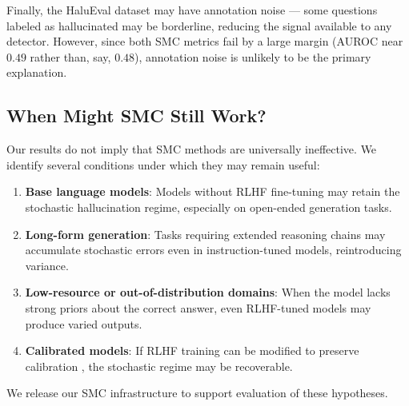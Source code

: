 Finally, the HaluEval dataset may have annotation noise --- some questions labeled as hallucinated may be borderline, reducing the signal available to any detector. However, since both SMC metrics fail by a large margin (AUROC near $0.49$ rather than, say, $0.48$), annotation noise is unlikely to be the primary explanation.

\subsection{When Might SMC Still Work?}

Our results do not imply that SMC methods are universally ineffective. We identify several conditions under which they may remain useful:

\begin{enumerate}
  \item \textbf{Base language models}: Models without RLHF fine-tuning may retain the stochastic hallucination regime, especially on open-ended generation tasks.
  \item \textbf{Long-form generation}: Tasks requiring extended reasoning chains may accumulate stochastic errors even in instruction-tuned models, reintroducing variance.
  \item \textbf{Low-resource or out-of-distribution domains}: When the model lacks strong priors about the correct answer, even RLHF-tuned models may produce varied outputs.
  \item \textbf{Calibrated models}: If RLHF training can be modified to preserve calibration \cite{Xiong2023Can}, the stochastic regime may be recoverable.
\end{enumerate}

We release our SMC infrastructure to support evaluation of these hypotheses.

